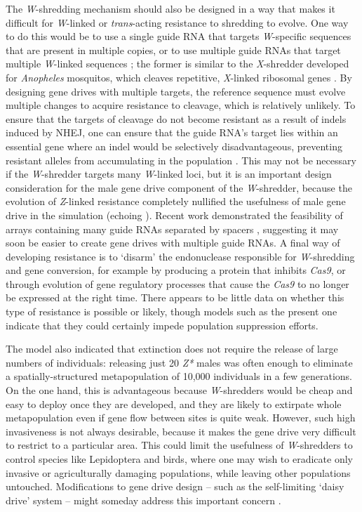 \documentclass[]{rsos}%
\begin{document}
The \emph{W}-shredding mechanism should also be designed in a way that
makes it difficult for \emph{W}-linked or \emph{trans}-acting resistance
to shredding to evolve. One way to do this would be to use a single
guide RNA that targets \emph{W}-specific sequences that are present in
multiple copies, or to use multiple guide RNAs that target multiple
\emph{W}-linked sequences \citep{champer2018re, oberhofer2018be}; the
former is similar to the \emph{X}-shredder developed for
\emph{Anopheles} mosquitos, which cleaves repetitive, \emph{X}-linked
ribosomal genes \citep{galizi2014sy}. By designing gene drives with
multiple targets, the reference sequence must evolve multiple changes to
acquire resistance to cleavage, which is relatively unlikely. To ensure
that the targets of cleavage do not become resistant as a result of
indels induced by NHEJ, one can ensure that the guide RNA's target lies
within an essential gene where an indel would be selectively
disadvantageous, preventing resistant alleles from accumulating in the
population \citep{champer2018re, oberhofer2018be}. This may not be
necessary if the \emph{W}-shredder targets many \emph{W}-linked loci,
but it is an important design consideration for the male gene drive
component of the \emph{W}-shredder, because the evolution of
\emph{Z}-linked resistance completely nullified the usefulness of male
gene drive in the simulation (echoing \citep{unckless2017ev}). Recent
work demonstrated the feasibility of arrays containing many guide RNAs
separated by spacers \citep{kurata2018hi}, suggesting it may soon be
easier to create gene drives with multiple guide RNAs. A final way of
developing resistance is to `disarm' the endonuclease responsible for
\emph{W}-shredding and gene conversion, for example by producing a
protein that inhibits \emph{Cas9}, or through evolution of gene
regulatory processes that cause the \emph{Cas9} to no longer be
expressed at the right time. There appears to be little data on whether
this type of resistance is possible or likely, though models such as the
present one indicate that they could certainly impede population
suppression efforts.

The model also indicated that extinction does not require the release of
large numbers of individuals: releasing just 20 \emph{Z*} males was
often enough to eliminate a spatially-structured metapopulation of
10,000 individuals in a few generations. On the one hand, this is
advantageous because \emph{W}-shredders would be cheap and easy to
deploy once they are developed, and they are likely to extirpate whole
metapopulation even if gene flow between sites is quite weak. However,
such high invasiveness is not always desirable, because it makes the
gene drive very difficult to restrict to a particular area. This could
limit the usefulness of \emph{W}-shredders to control species like
Lepidoptera and birds, where one may wish to eradicate only invasive or
agriculturally damaging populations, while leaving other populations
untouched. Modifications to gene drive design -- such as the
self-limiting `daisy drive' system -- might someday address this
important concern \citep{min2017da, noble2019da}.
\end{document}
